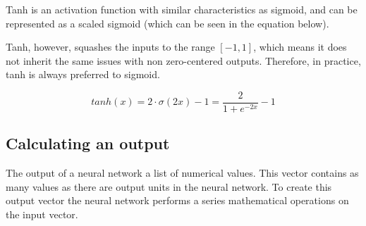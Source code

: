 Tanh is an activation function with similar characteristics as sigmoid, and can be represented as a scaled sigmoid (which can be seen in the equation below).

Tanh, however, squashes the inputs to the range $[-1, 1]$, which means it does not inherit the same issues with non zero-centered outputs. Therefore, in practice, tanh is always preferred to sigmoid. \cite{_neural_2018}

\begin{equation} \label{eqn:tanh}
    tanh(x) = 2 \cdot \sigma(2x) - 1 = \frac{2}{1+e^{-2x}} -1
\end{equation}

\subsection{Calculating an output}
\label{calculating_an_output}

The output of a neural network a list of numerical values. This vector contains as many values as there are output units in the neural network. To create this output vector the neural network performs a series mathematical operations on the input vector. 

